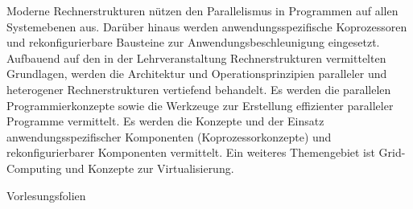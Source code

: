 \begin{course}
\begin{content}
Moderne Rechnerstrukturen nützen den Parallelismus in Programmen auf allen Systemebenen aus. Darüber hinaus werden anwendungsspezifische Koprozessoren und rekonfigurierbare Bausteine zur Anwendungsbeschleunigung eingesetzt. Aufbauend auf den in der Lehrveranstaltung Rechnerstrukturen vermittelten Grundlagen, werden die Architektur und Operationsprinzipien paralleler und heterogener Rechnerstrukturen vertiefend behandelt. Es werden die parallelen Programmierkonzepte sowie die Werkzeuge zur Erstellung effizienter paralleler Programme vermittelt. Es werden die Konzepte und der Einsatz anwendungsspezifischer Komponenten (Koprozessorkonzepte) und rekonfigurierbarer Komponenten vermittelt. Ein weiteres Themengebiet ist Grid-Computing und Konzepte zur Virtualisierung.


\end{content}

\begin{media}Vorlesungsfolien

\end{media}





\end{course}
